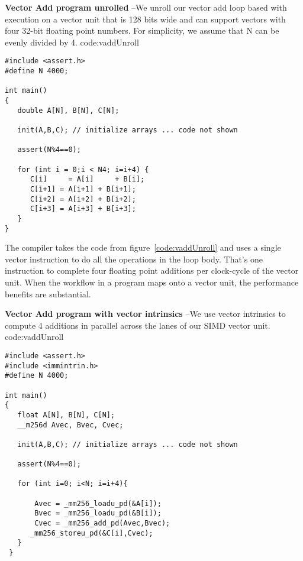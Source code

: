 \begin{CodeExample}%
{\textbf{Vector Add program unrolled} --\small We unroll our vector add loop based with execution 
on a vector unit that is 128 bits wide and can support vectors with four 32-bit floating point numbers.  For 
simplicity, we assume that N can be evenly divided by 4.
}%
{code:vaddUnroll}
\begin{lstlisting}
#include <assert.h>
#define N 4000;

int main()
{
   double A[N], B[N], C[N];
   
   init(A,B,C); // initialize arrays ... code not shown
   
   assert(N%4==0);

   for (int i = 0;i < N4; i=i+4) {
      C[i]     = A[i]     + B[i];
      C[i+1] = A[i+1] + B[i+1];
      C[i+2] = A[i+2] + B[i+2];
      C[i+3] = A[i+3] + B[i+3];   
   }
}	  
\end{lstlisting}
\end{CodeExample}

The compiler takes the code from figure~\ref{code:vaddUnroll} and uses a single vector instruction 
to do all the operations in the loop body.   That's one instruction to complete four floating point additions
per clock-cycle of the vector unit.  When the workflow in a program maps onto a vector unit, the performance 
benefits are substantial.

\begin{CodeExample}%
{\textbf{Vector Add program with vector intrinsics} --\small We use vector intrinsics to compute 
4 additions in parallel across the lanes of our SIMD vector unit. 
}%
{code:vaddUnroll}
\begin{lstlisting}
#include <assert.h>
#include <immintrin.h>
#define N 4000;

int main()
{
   float A[N], B[N], C[N];
   __m256d Avec, Bvec, Cvec;    
     
   init(A,B,C); // initialize arrays ... code not shown
   
   assert(N%4==0);

   for (int i=0; i<N; i=i+4){

       Avec = _mm256_loadu_pd(&A[i]);
       Bvec = _mm256_loadu_pd(&B[i]);
       Cvec = _mm256_add_pd(Avec,Bvec);
      _mm256_storeu_pd(&C[i],Cvec);
   }
 }
\end{lstlisting}
\end{CodeExample}

